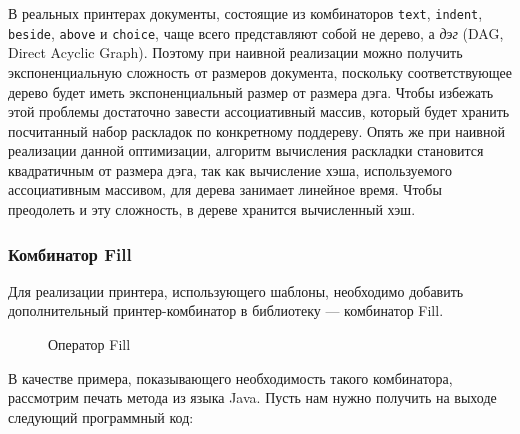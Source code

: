 В реальных принтерах документы, состоящие из комбинаторов
\lstinline[language=Haskell]{text},
\lstinline[language=Haskell]{indent},
\lstinline[language=Haskell]{beside},
\lstinline[language=Haskell]{above} и \lstinline[language=Haskell]{choice}, чаще всего
представляют собой не дерево, а \emph{дэг} (DAG, Direct Acyclic Graph). Поэтому при наивной
реализации можно получить экспоненциальную сложность от размеров документа,
поскольку соответствующее дерево будет иметь экспоненциальный размер от размера дэга.
Чтобы избежать этой проблемы достаточно завести ассоциативный массив,
который будет хранить посчитанный набор раскладок по конкретному поддереву.
Опять же при наивной реализации данной оптимизации,
алгоритм вычисления раскладки становится квадратичным от размера дэга,
так как вычисление хэша, используемого ассоциативным массивом, для дерева занимает
линейное время. Чтобы преодолеть и эту сложность, в дереве хранится вычисленный хэш.

\subsubsection{Комбинатор Fill}

Для реализации принтера, использующего шаблоны, необходимо добавить
дополнительный принтер-комбинатор в библиотеку --- комбинатор Fill.

\begin{figure}[h!]
  \centering
	\quad
	\caption{Оператор Fill}
\end{figure}

В качестве примера, показывающего необходимость такого комбинатора, рассмотрим
печать метода из языка Java. Пусть нам нужно получить на выходе следующий программный
код:

